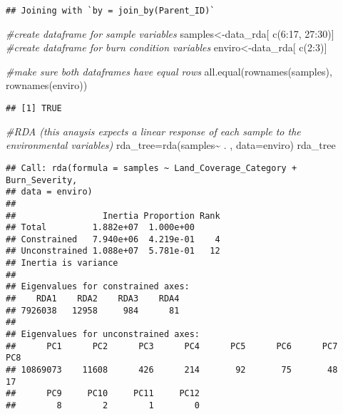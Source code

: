 \documentclass[
]{article}
\newenvironment{Shaded}{\begin{snugshade}}{\end{snugshade}}
\newcommand{\AttributeTok}[1]{\textcolor[rgb]{0.77,0.63,0.00}{#1}}
\newcommand{\CommentTok}[1]{\textcolor[rgb]{0.56,0.35,0.01}{\textit{#1}}}
\newcommand{\DecValTok}[1]{\textcolor[rgb]{0.00,0.00,0.81}{#1}}
\newcommand{\FunctionTok}[1]{\textcolor[rgb]{0.00,0.00,0.00}{#1}}
\newcommand{\NormalTok}[1]{#1}
\newcommand{\OtherTok}[1]{\textcolor[rgb]{0.56,0.35,0.01}{#1}}
\newcommand{\SpecialCharTok}[1]{\textcolor[rgb]{0.00,0.00,0.00}{#1}}
\begin{document}
\begin{verbatim}
## Joining with `by = join_by(Parent_ID)`
\end{verbatim}

\begin{Shaded}
\begin{Highlighting}[]
\CommentTok{\#create dataframe for sample variables}
\NormalTok{samples}\OtherTok{\textless{}{-}}\NormalTok{data\_rda[ }\FunctionTok{c}\NormalTok{(}\DecValTok{6}\SpecialCharTok{:}\DecValTok{17}\NormalTok{, }\DecValTok{27}\SpecialCharTok{:}\DecValTok{30}\NormalTok{)]}
\CommentTok{\#create dataframe for burn condition variables}
\NormalTok{enviro}\OtherTok{\textless{}{-}}\NormalTok{data\_rda[ }\FunctionTok{c}\NormalTok{(}\DecValTok{2}\SpecialCharTok{:}\DecValTok{3}\NormalTok{)]}

\CommentTok{\#make sure both dataframes have equal rows}
\FunctionTok{all.equal}\NormalTok{(}\FunctionTok{rownames}\NormalTok{(samples), }\FunctionTok{rownames}\NormalTok{(enviro))}
\end{Highlighting}
\end{Shaded}

\begin{verbatim}
## [1] TRUE
\end{verbatim}

\begin{Shaded}
\begin{Highlighting}[]
\CommentTok{\#RDA (this anaysis expects a linear response of each sample to the environmental variables)}
\NormalTok{rda\_tree}\OtherTok{=}\FunctionTok{rda}\NormalTok{(samples}\SpecialCharTok{\textasciitilde{}}\NormalTok{ . , }\AttributeTok{data=}\NormalTok{enviro)}
\NormalTok{rda\_tree}
\end{Highlighting}
\end{Shaded}

\begin{verbatim}
## Call: rda(formula = samples ~ Land_Coverage_Category + Burn_Severity,
## data = enviro)
## 
##                 Inertia Proportion Rank
## Total         1.882e+07  1.000e+00     
## Constrained   7.940e+06  4.219e-01    4
## Unconstrained 1.088e+07  5.781e-01   12
## Inertia is variance 
## 
## Eigenvalues for constrained axes:
##    RDA1    RDA2    RDA3    RDA4 
## 7926038   12958     984      81 
## 
## Eigenvalues for unconstrained axes:
##      PC1      PC2      PC3      PC4      PC5      PC6      PC7      PC8 
## 10869073    11608      426      214       92       75       48       17 
##      PC9     PC10     PC11     PC12 
##        8        2        1        0
\end{verbatim}
\end{document}
